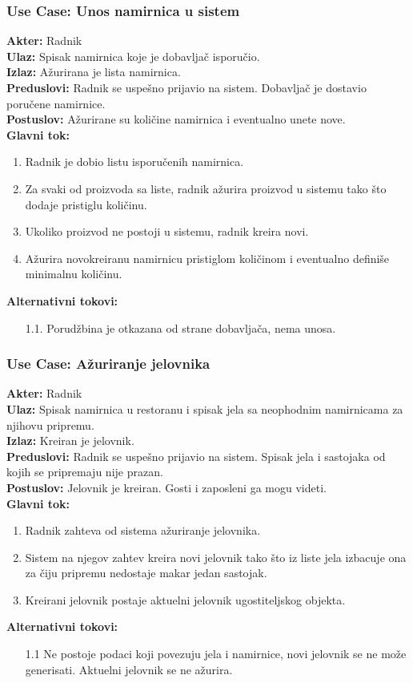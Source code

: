 \documentclass{article}
\begin{document}
\subsubsection{\textbf{Use Case}: Unos namirnica u sistem}
\textbf{Akter:} Radnik\\
\textbf{Ulaz:} Spisak namirnica koje je dobavljač isporučio.\\
\textbf{Izlaz:} Ažurirana je lista namirnica.\\
\textbf{Preduslovi:} Radnik se uspešno prijavio na sistem. Dobavljač je dostavio poručene namirnice.\\
\textbf{Postuslov:} Ažurirane su količine namirnica i eventualno unete nove.\\
\textbf{Glavni tok:} 
\begin{enumerate}
	\item Radnik je dobio listu isporučenih namirnica.
	\item Za svaki od proizvoda sa liste, radnik ažurira proizvod u sistemu tako što dodaje pristiglu količinu.
	\item Ukoliko proizvod ne postoji u sistemu, radnik kreira novi.
	\item Ažurira novokreiranu namirnicu pristiglom količinom i eventualno definiše minimalnu količinu. 
\end{enumerate}
\textbf{Alternativni tokovi:}
\begin{itemize}
\item [1.1.] Porudžbina je otkazana od strane dobavljača, nema unosa.
\end{itemize}


\subsubsection{\textbf{Use Case}: Ažuriranje jelovnika}
\textbf{Akter:} Radnik\\
\textbf{Ulaz:} Spisak namirnica u restoranu i spisak jela sa neophodnim namirnicama za njihovu pripremu.\\
\textbf{Izlaz:} Kreiran je jelovnik.\\
\textbf{Preduslovi:} Radnik se uspešno prijavio na sistem. Spisak jela i sastojaka od kojih se pripremaju nije prazan.\\
\textbf{Postuslov:} Jelovnik je kreiran. Gosti i zaposleni ga mogu videti.\\
\textbf{Glavni tok:} 
\begin{enumerate}
	\item Radnik zahteva od sistema ažuriranje jelovnika.
	\item Sistem na njegov zahtev kreira novi jelovnik tako što iz liste jela izbacuje ona za čiju pripremu nedostaje makar jedan sastojak.
	\item Kreirani jelovnik postaje aktuelni jelovnik ugostiteljskog objekta.
\end{enumerate}
\textbf{Alternativni tokovi:}
\begin{itemize}
\item [1.1] Ne postoje podaci koji povezuju jela i namirnice, novi jelovnik se ne može generisati. Aktuelni jelovnik se ne ažurira.
\end{itemize}
\end{document}
